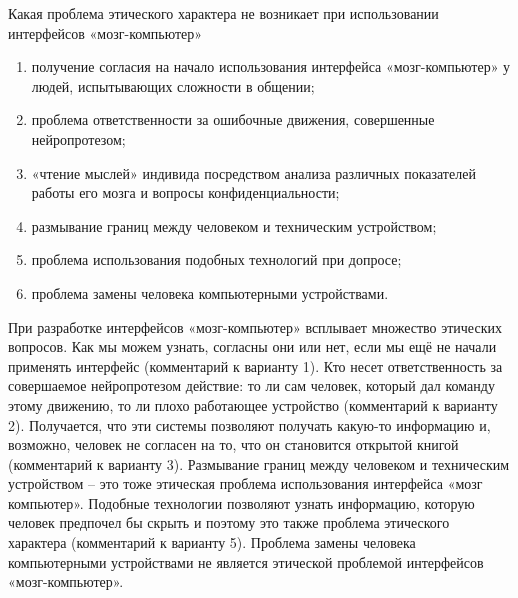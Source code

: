 
Какая проблема этического характера не возникает при использовании интерфейсов «мозг-компьютер»

\begin{enumerate}
    \item получение согласия на начало использования интерфейса «мозг-компьютер» у людей, испытывающих сложности в общении;
    \item проблема ответственности за ошибочные движения, совершенные нейропротезом;
    \item «чтение мыслей» индивида посредством анализа различных показателей работы его мозга и вопросы конфиденциальности;
    \item размывание границ между человеком и техническим устройством;
    \item проблема использования подобных технологий при допросе;
    \item проблема замены человека компьютерными устройствами.
\end{enumerate}

\explanationSection

При разработке интерфейсов «мозг-компьютер» всплывает множество этических вопросов. Как мы можем узнать, согласны они или нет, если мы ещё не начали применять интерфейс (комментарий к варианту 1). Кто несет ответственность за совершаемое нейропротезом действие: то ли сам человек, который дал команду этому движению, то ли плохо работающее устройство (комментарий к варианту 2).  Получается, что эти системы позволяют получать какую-то информацию и, возможно, человек не согласен на то, что он становится открытой книгой (комментарий к варианту 3). Размывание границ между человеком и техническим устройством – это тоже этическая проблема использования интерфейса «мозг компьютер». Подобные технологии позволяют узнать информацию, которую человек предпочел бы скрыть и поэтому это также проблема этического характера (комментарий к варианту 5).  Проблема замены человека компьютерными устройствами не является этической проблемой интерфейсов «мозг-компьютер».

